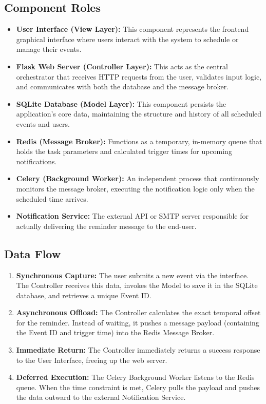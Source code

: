\subsection{Component Roles}
\begin{itemize}
	\item \textbf{User Interface (View Layer):} This component represents the frontend graphical interface where users interact with the system to schedule or manage their events.
	\item \textbf{Flask Web Server (Controller Layer):} This acts as the central orchestrator that receives HTTP requests from the user, validates input logic, and communicates with both the database and the message broker.
	\item \textbf{SQLite Database (Model Layer):} This component persists the application's core data, maintaining the structure and history of all scheduled events and users.
	\item \textbf{Redis (Message Broker):} Functions as a temporary, in-memory queue that holds the task parameters and calculated trigger times for upcoming notifications.
	\item \textbf{Celery (Background Worker):} An independent process that continuously monitors the message broker, executing the notification logic only when the scheduled time arrives.
	\item \textbf{Notification Service:} The external API or SMTP server responsible for actually delivering the reminder message to the end-user.
\end{itemize}

\subsection{Data Flow}
\begin{enumerate}
	\item \textbf{Synchronous Capture:} The user submits a new event via the interface. The Controller receives this data, invokes the Model to save it in the SQLite database, and retrieves a unique Event ID.
	\item \textbf{Asynchronous Offload:} The Controller calculates the exact temporal offset for the reminder. Instead of waiting, it pushes a message payload (containing the Event ID and trigger time) into the Redis Message Broker.
	\item \textbf{Immediate Return:} The Controller immediately returns a success response to the User Interface, freeing up the web server.
	\item \textbf{Deferred Execution:} The Celery Background Worker listens to the Redis queue. When the time constraint is met, Celery pulls the payload and pushes the data outward to the external Notification Service.
\end{enumerate}

